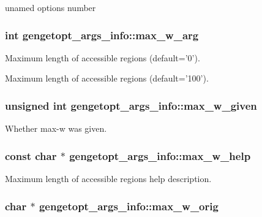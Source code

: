 unamed options number 

\hypertarget{structgengetopt__args__info_a9bc5ef56f828d6fb7ce0525884d6ed07}{
\subsubsection[{max\+\_\+w\+\_\+arg}]{\setlength{\rightskip}{0pt plus 5cm}int gengetopt\+\_\+args\+\_\+info\+::max\+\_\+w\+\_\+arg}}\label{structgengetopt__args__info_a9bc5ef56f828d6fb7ce0525884d6ed07}


Maximum length of accessible regions (default='0'). 

Maximum length of accessible regions (default='100'). \hypertarget{structgengetopt__args__info_aa982c2dc155c088dfd006708ce04c5ed}{
\subsubsection[{max\+\_\+w\+\_\+given}]{\setlength{\rightskip}{0pt plus 5cm}unsigned int gengetopt\+\_\+args\+\_\+info\+::max\+\_\+w\+\_\+given}}\label{structgengetopt__args__info_aa982c2dc155c088dfd006708ce04c5ed}


Whether max-\/w was given. 

\hypertarget{structgengetopt__args__info_a84421172a52bd1de77c3a500fddb731b}{
\subsubsection[{max\+\_\+w\+\_\+help}]{\setlength{\rightskip}{0pt plus 5cm}const char $\ast$ gengetopt\+\_\+args\+\_\+info\+::max\+\_\+w\+\_\+help}}\label{structgengetopt__args__info_a84421172a52bd1de77c3a500fddb731b}


Maximum length of accessible regions help description. 

\hypertarget{structgengetopt__args__info_a13203309b03664cded43fc7c50065c15}{
\subsubsection[{max\+\_\+w\+\_\+orig}]{\setlength{\rightskip}{0pt plus 5cm}char $\ast$ gengetopt\+\_\+args\+\_\+info\+::max\+\_\+w\+\_\+orig}}\label{structgengetopt__args__info_a13203309b03664cded43fc7c50065c15}


